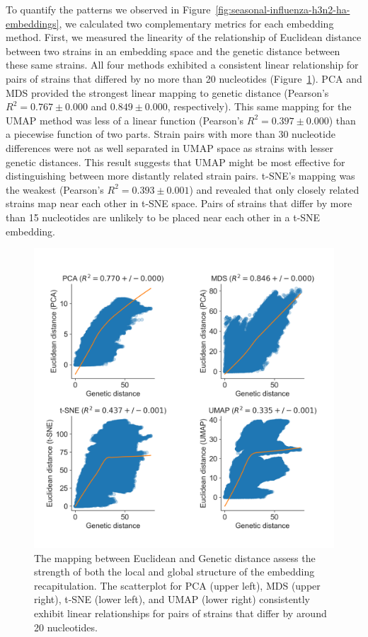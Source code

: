 \documentclass[9pt,lineno]{elife}
\begin{document}
To quantify the patterns we observed in Figure~\ref{fig:seasonal-influenza-h3n2-ha-embeddings}, we calculated two complementary metrics for each embedding method.
First, we measured the linearity of the relationship of Euclidean distance between two strains in an embedding space and the genetic distance between these same strains.
All four methods exhibited a consistent linear relationship for pairs of strains that differed by no more than 20 nucleotides (Figure~\ref{fig:seasonal-influenza-h3n2-ha-pairwise-distances}).
PCA and MDS provided the strongest linear mapping to genetic distance (Pearson's $R^{2} = 0.767 \pm 0.000$  and $0.849 \pm 0.000$, respectively).
This same mapping for the UMAP method was less of a linear function (Pearson's $R^{2} = 0.397 \pm 0.000$) than a piecewise function of two parts.
Strain pairs with more than 30 nucleotide differences were not as well separated in UMAP space as strains with lesser genetic distances.
This result suggests that UMAP might be most effective for distinguishing between more distantly related strain pairs.
t-SNE's mapping was the weakest (Pearson's $R^{2} = 0.393 \pm 0.001$) and revealed that only closely related strains map near each other in t-SNE space.
Pairs of strains that differ by more than 15 nucleotides are unlikely to be placed near each other in a t-SNE embedding.

\begin{figure}[htb]
  \begin{center}
  \includegraphics[width=\columnwidth]{FullScatterplotFlu.png}
  \caption{
    The mapping between Euclidean and Genetic distance assess the strength of both the local and global structure of the embedding recapitulation.
    The scatterplot for PCA (upper left), MDS (upper right), t-SNE (lower left), and UMAP (lower right) consistently exhibit linear relationships for pairs of strains that differ by around 20 nucleotides.
  }
  \label{fig:seasonal-influenza-h3n2-ha-pairwise-distances}
  \end{center}
\end{figure}
\end{document}
